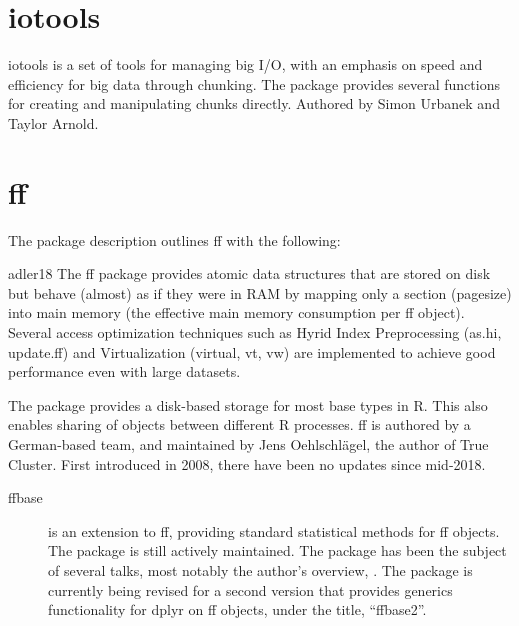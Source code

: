 \documentclass[10pt,a4paper]{article}
\begin{document}
\section{iotools}
\label{sec:iotools}

iotools is a set of tools for managing big I/O, with an emphasis on
speed and efficiency for big data through chunking\cite{urbanek20b}.
The package provides several functions for creating and manipulating
chunks directly. Authored by Simon Urbanek and Taylor Arnold.

\section{ff}
\label{sec:ff}

The package description outlines ff with the following:

\begin{displaycquote}{adler18}
	The ff package provides atomic data structures that are stored on
	disk but behave (almost) as if they were in RAM by mapping only a
	section (pagesize) into main memory (the effective main memory
	consumption per ff object). Several access optimization techniques
	such as Hyrid Index Preprocessing (as.hi, update.ff) and
	Virtualization (virtual, vt, vw) are implemented to achieve good
	performance even with large datasets.
\end{displaycquote}

The package provides a disk-based storage for most base types in R.
This also enables sharing of objects between different R processes. ff
is authored by a German-based team, and maintained by Jens
Oehlschlägel, the author of True Cluster. First introduced in
2008\cite{adler08:_large_r}, there have been no updates since
mid-2018.

\begin{description}
	\item[ffbase\cite{jonge20}] is an extension to ff, providing standard
	      statistical methods for ff objects. The package is still actively
	      maintained. The package has been the subject of several talks, most
	      notably the author's overview, \textcite{wijffels13}. The package is
	      currently being revised for a second version that provides generics
	      functionality for dplyr on ff objects, under the title,
	      ``ffbase2''\cite{jonge15}.
\end{description}

\printbibliography{}
\end{document}
